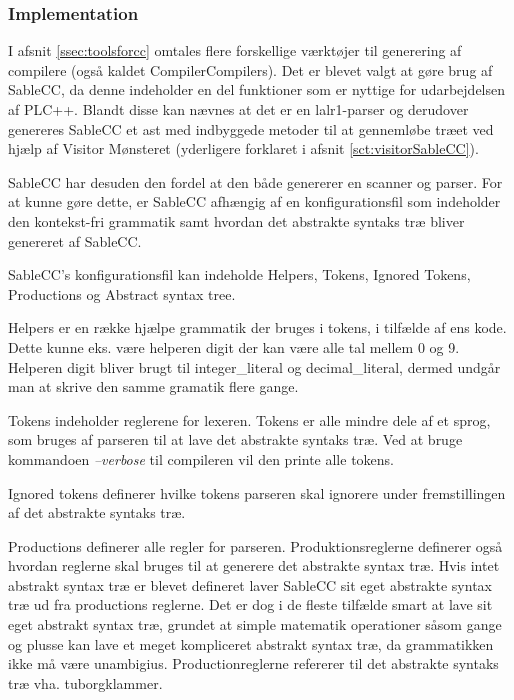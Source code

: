 \subsubsection{Implementation}

I afsnit \ref{ssec:toolsforcc} omtales flere forskellige værktøjer til generering af compilere (også kaldet CompilerCompilers). Det er blevet valgt at gøre brug af SableCC, da denne indeholder en del funktioner som er nyttige for udarbejdelsen af PLC++. Blandt disse kan nævnes at det er en \gls{lalr}1-parser og derudover genereres SableCC et \gls{ast} med indbyggede metoder til at gennemløbe træet ved hjælp af Visitor Mønsteret (yderligere forklaret i afsnit \ref{sct:visitorSableCC}).

SableCC har desuden den fordel at den både genererer en scanner og parser. For at kunne gøre dette, er SableCC afhængig af en konfigurationsfil som indeholder den kontekst-fri grammatik samt hvordan det abstrakte syntaks træ bliver genereret af SableCC.

SableCC's konfigurationsfil kan indeholde Helpers, Tokens, Ignored Tokens, Productions og Abstract syntax tree.

Helpers er en række hjælpe grammatik der bruges i tokens, i tilfælde af ens kode. Dette kunne eks. være helperen digit der kan være alle tal mellem 0 og 9. Helperen digit bliver brugt til integer\_literal og decimal\_literal, dermed undgår man at skrive den samme gramatik flere gange.

Tokens indeholder reglerene for lexeren. Tokens er alle mindre dele af et sprog, som bruges af parseren til at lave det abstrakte syntaks træ. Ved at bruge kommandoen \textit{--verbose} til compileren vil den printe alle tokens.

Ignored tokens definerer hvilke tokens parseren skal ignorere under fremstillingen af det abstrakte syntaks træ.

Productions definerer alle regler for parseren. Produktionsreglerne definerer også hvordan reglerne skal bruges til at generere det abstrakte syntax træ. Hvis intet abstrakt syntax træ er blevet defineret laver SableCC sit eget abstrakte syntax træ ud fra productions reglerne. Det er dog i de fleste tilfælde smart at lave sit eget abstrakt syntax træ, grundet at simple matematik operationer såsom gange og plusse kan lave et meget kompliceret abstrakt syntax træ, da grammatikken ikke må være unambigius. Productionreglerne refererer til det abstrakte syntaks træ vha. tuborgklammer. 

